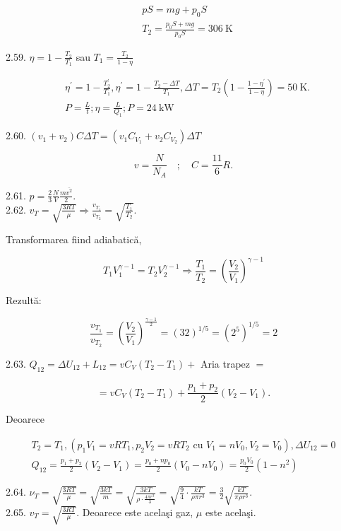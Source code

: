 \documentclass[10pt]{article}
\begin{document}
$$
\begin{aligned}
& p S=m g+p_{0} S \\
& T_{2}=\frac{p_{0} S+m g}{p_{0} S}=306 \mathrm{~K}
\end{aligned}
$$

2.59. $\eta=1-\frac{T_{2}}{T_{1}}$ sau $T_{1}=\frac{T_{2}}{1-\eta}$

$$
\begin{aligned}
& \eta^{\prime}=1-\frac{T_{2}^{\prime}}{T_{1}}, \eta^{\prime}=1-\frac{T_{2}-\Delta T}{T_{1}}, \Delta T=T_{2}\left(1-\frac{1-\eta^{\prime}}{1-\eta}\right)=50 \mathrm{~K} . \\
& P=\frac{L}{t} ; \eta=\frac{L}{Q_{1}} ; P=24 \mathrm{~kW}
\end{aligned}
$$

2.60. $\left(v_{1}+v_{2}\right) C \Delta T=\left(v_{1} C_{V_{1}}+v_{2} C_{V_{2}}\right) \Delta T$

$$
v=\frac{N}{N_{A}} \quad ; \quad C=\frac{11}{6} R .
$$

2.61. $p=\frac{2}{3} \frac{N}{V} \frac{m \overline{v^{2}}}{2}$.\\
2.62. $v_{T}=\sqrt{\frac{3 R T}{\mu}} \Rightarrow \frac{v_{T_{1}}}{v_{T_{2}}}=\sqrt{\frac{T_{1}}{T_{2}}}$.

Transformarea fiind adiabatică,

$$
T_{1} V_{1}^{\gamma-1}=T_{2} V_{2}^{\gamma-1} \Rightarrow \frac{T_{1}}{T_{2}}=\left(\frac{V_{2}}{V_{1}}\right)^{\gamma-1}
$$

Rezultă:

$$
\frac{v_{T_{1}}}{v_{T_{2}}}=\left(\frac{V_{2}}{V_{1}}\right)^{\frac{\gamma-1}{2}}=(32)^{1 / 5}=\left(2^{5}\right)^{1 / 5}=2
$$

2.63. $Q_{12}=\Delta U_{12}+L_{12}=v C_{V}\left(T_{2}-T_{1}\right)+$ Aria trapez $=$

$$
=v C_{V}\left(T_{2}-T_{1}\right)+\frac{p_{1}+p_{2}}{2}\left(V_{2}-V_{1}\right) .
$$

Deoarece

$$
\begin{gathered}
T_{2}=T_{1},\left(p_{1} V_{1}=v R T_{1}, p_{2} V_{2}=v R T_{2} \text { cu } V_{1}=n V_{0}, V_{2}=V_{0}\right), \Delta U_{12}=0 \\
Q_{12}=\frac{p_{1}+p_{2}}{2}\left(V_{2}-V_{1}\right)=\frac{p_{0}+n p_{0}}{2}\left(V_{0}-n V_{0}\right)=\frac{p_{0} V_{0}}{2}\left(1-n^{2}\right)
\end{gathered}
$$

2.64. $\nu_{T}=\sqrt{\frac{3 R T}{\mu}}=\sqrt{\frac{3 k T}{m}}=\sqrt{\frac{3 k T}{\rho \cdot \frac{4 \pi r^{3}}{3}}}=\sqrt{\frac{9}{4} \cdot \frac{k T}{\rho \pi r^{3}}}=\frac{3}{2} \sqrt{\frac{k T}{\pi \rho r^{3}}}$.\\
2.65. $v_{T}=\sqrt{\frac{3 R T}{\mu}}$. Deoarece este acelaşi gaz, $\mu$ este acelaşi.
\end{document}
